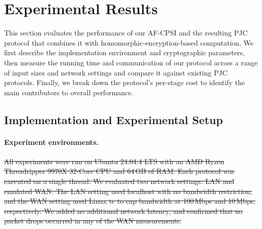 \DeclareRobustCommand{\PJCdel}[1]{{\color{black}\sout{#1}}}
\DeclareRobustCommand{\PJCadd}[1]{{\color{red}#1}}
\DeclareRobustCommand{\PJCcell}[2]{%
  \begin{tabular}[c]{@{}c@{}}\PJCdel{#1}\\\PJCadd{#2}\end{tabular}%
}

\section{Experimental Results}
\label{sec:experimental-results}
This section evaluates the performance of our AF-CPSI and the resulting
PJC protocol that combines it with homomorphic-encryption-based
computation. We first describe the implementation environment and
cryptographic parameters, then measure the running time and communication
of our protocol across a range of input sizes and network settings and
compare it against existing PJC protocols. Finally, we break down the
protocol's per-stage cost to identify the main contributors to overall
performance.



\subsection{Implementation and Experimental Setup}
\label{sec:experimental-setup}

\paragraph{Experiment environments.}
\PJCdel{All experiments were run on Ubuntu 24.04.4 LTS with an AMD Ryzen
Threadripper 9970X 32-Core CPU and 64\,GB of RAM. Each protocol was
executed on a single thread. We evaluated two network settings: LAN and
emulated WAN. The LAN setting used localhost with no bandwidth
restriction, and the WAN setting used Linux \textsf{tc} to cap bandwidth
at 100\,Mbps and 10\,Mbps, respectively. We added no additional network
latency, and confirmed that no packet drops occurred in any of the WAN
measurements.}

